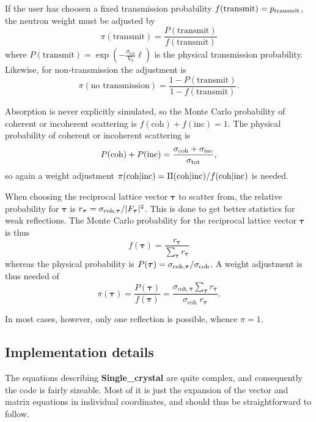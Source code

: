 If the user has choosen a fixed transmission probability $f({\rm
  transmit}) = p_\textrm{transmit}$, the neutron weight must be adjusted by
$$ \pi(\textrm{transmit}) = \frac{P(\textrm{transmit})}{f(\textrm{transmit})}
$$
where $P(\textrm{transmit}) = \exp(-\frac{\sigma_\textrm{tot}}{V_0}\ell)$ is
the physical transmission probability. Likewise, for non-transmission
the adjustment is
$$ \pi(\textrm{no~transmission}) = \frac{1-P(\textrm{transmit})}{1-f(\textrm{transmit})}.
$$

Absorption is never explicitly simulated, so the Monte Carlo probability
of coherent or incoherent scattering is
$f(\textrm{coh})+f(\textrm{inc}) = 1$.
The physical probability of coherent or incoherent scattering is
$$ P(\textrm{coh})+P(\textrm{inc}) = \frac{\sigma_\textrm{coh} + \sigma_{\rm
    inc}}{\sigma_\textrm{tot}}, $$
so again a weight adjustment $\pi(\textrm{coh}|\textrm{inc}) = \Pi({\rm
    coh}|\textrm{inc})/f(\textrm{coh}|\textrm{inc})$ is needed.

When choosing the reciprocal lattice vector $\boldsymbol{\tau}$ to
scatter from, the relative probability for $\boldsymbol{\tau}$ is
$r_{\boldsymbol{\tau}} = \sigma_{{\rm
    coh},\boldsymbol{\tau}}/|F_{\boldsymbol{\tau}}|^2$. This is done to
get better statistics for weak reflections. The Monte Carlo probability
for the reciprocal lattice vector $\boldsymbol{\tau}$ is thus
$$ f(\boldsymbol{\tau}) =
\frac{r_{\boldsymbol{\tau}}}{\sum_{\boldsymbol{\tau}} r_{\boldsymbol{\tau}}}
$$
whereas the physical probability is $P(\boldsymbol{\tau}) = \sigma_{{\rm
    coh},\boldsymbol{\tau}}/\sigma_\textrm{coh}$. A weight adjustment is
thus needed of
$$
\pi(\boldsymbol{\tau}) =
 \frac{P(\boldsymbol{\tau})}{f(\boldsymbol{\tau})} =
 \frac{\sigma_{\textrm{coh},\boldsymbol{\tau}}
  \sum_{\boldsymbol{\tau}} r_{\boldsymbol{\tau}}}
 {\sigma_\textrm{coh} \; r_{\boldsymbol{\tau}}}.$$

In most cases, however, only one reflection is possible, whence $\pi=1$.

\subsection{Implementation details}
\label{s:Single_crystal_implement}

The equations describing \textbf{Single\_crystal} are quite
complex, and consequently the code is fairly sizeable. Most of it is
just the expansion of the vector and matrix equations in individual
coordinates, and should thus be straightforward to follow.

